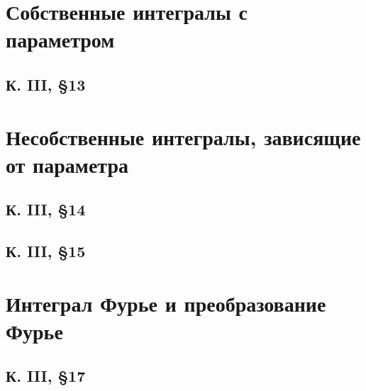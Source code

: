 




\section{Собственные интегралы с параметром}


\subsection{К. III, \S 13}





\section{Несобственные интегралы, зависящие от параметра}



\subsection{К. III, \S 14}





\subsection*{К. III, \S 15}





\section{Интеграл Фурье и преобразование Фурье}


\subsection{К. III, \S 17}












